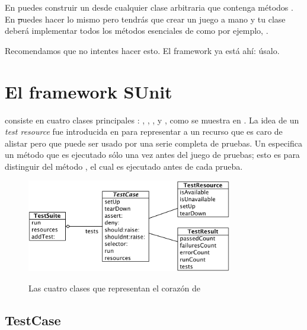 \documentclass[a4paper,10pt,twoside]{book}
\begin{document}
En \JUnit{} puedes construir un  desde cualquier clase arbitraria
que contenga m\'etodos . En \st puedes hacer lo mismo pero tendr\'as
que crear un juego a mano y tu clase deber\'a implementar todos los m\'etodos esenciales de 
  como por ejemplo, .

Recomendamos que no intentes hacer esto. El framework ya est\'a ah\'i: \'usalo.


\section{El framework SUnit}

\sunit consiste en cuatro clases principales : ,
, , y , como se muestra en .
La idea de un \emph{test resource} fue introducida en  para representar a un recurso
que es caro de alistar pero que puede ser usado por una serie completa de pruebas.  Un 
especifica un m\'etodo  que es ejecutado s\'olo una vez antes del juego de pruebas;
esto es para distinguir del m\'etodo , el cual es ejecutado antes de cada prueba. 


\begin{figure}[htb]
  \begin{center}
		{\includegraphics[width=0.8\textwidth]{sunit-classes}}
	\caption{Las cuatro clases que representan el coraz\'on de \SUnit}
  \end{center}
\end{figure}


\subsection{TestCase}
\end{document}
